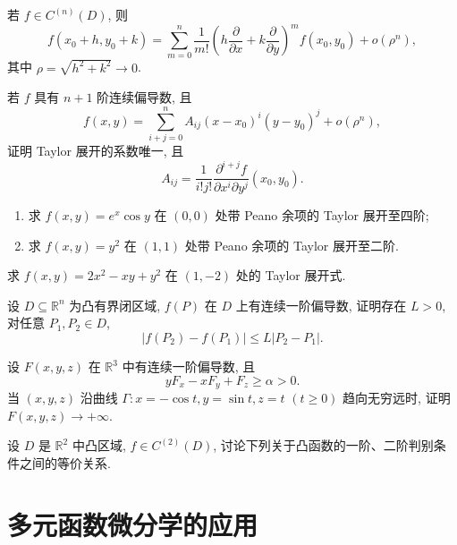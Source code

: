 \documentclass[../数学分析培优讲义.tex]{subfiles}
\begin{document}
\begin{theorem}
若 $f\in C^{(n)}(D)$, 则
\[
    f(x_0+h,y_0+k)
    =\sum\limits_{m=0}^n\dfrac{1}{m!}
    \left(h\dfrac{\partial}{\partial x}+k\dfrac{\partial}{\partial y}\right)^m f(x_0,y_0)
    +o(\rho^n),
\]
其中 $\rho=\sqrt{h^2+k^2}\to0$.
\end{theorem}

\begin{example}[\markstar]
若 $f$ 具有 $n+1$ 阶连续偏导数, 且
\[
    f(x,y)=\sum\limits_{i+j=0}^nA_{ij}(x-x_0)^i(y-y_0)^j+o(\rho^n),
\]
证明 Taylor 展开的系数唯一, 且
\[
    A_{ij}=\dfrac{1}{i!j!}
    \dfrac{\partial^{i+j}f}{\partial x^i\partial y^j}(x_0,y_0).
\]
\end{example}
\exampleblank

\begin{example}
\begin{enumerate}[label=(\arabic*)]
    \item 求 $f(x,y)=e^x\cos y$ 在 $(0,0)$ 处带 Peano 余项的 Taylor 展开至四阶;
    \item 求 $f(x,y)=y^2$ 在 $(1,1)$ 处带 Peano 余项的 Taylor 展开至二阶.
\end{enumerate}
\end{example}
\exampleblank

\begin{example}
求 $f(x,y)=2x^2-xy+y^2$ 在 $(1,-2)$ 处的 Taylor 展开式.
\end{example}
\exampleblank

\begin{example}
设 $D\subseteq\mathbb{R}^n$ 为凸有界闭区域, $f(P)$ 在 $D$ 上有连续一阶偏导数, 证明存在 $L>0$, 对任意 $P_1,P_2\in D$,
\[
    |f(P_2)-f(P_1)|\leq L|P_2-P_1|.
\]
\end{example}
\exampleblank

\begin{example}
设 $F(x,y,z)$ 在 $\mathbb{R}^3$ 中有连续一阶偏导数, 且
\[
    yF_x-xF_y+F_z\geq\alpha>0.
\]
当 $(x,y,z)$ 沿曲线 $\Gamma:x=-\cos t,y=\sin t,z=t$ $(t\geq0)$ 趋向无穷远时, 证明 $F(x,y,z)\to+\infty$.
\end{example}
\exampleblank

\begin{example}
设 $D$ 是 $\mathbb{R}^2$ 中凸区域, $f\in C^{(2)}(D)$, 讨论下列关于凸函数的一阶、二阶判别条件之间的等价关系.
\end{example}
\exampleblank


\newpage

\section{多元函数微分学的应用}
\end{document}
